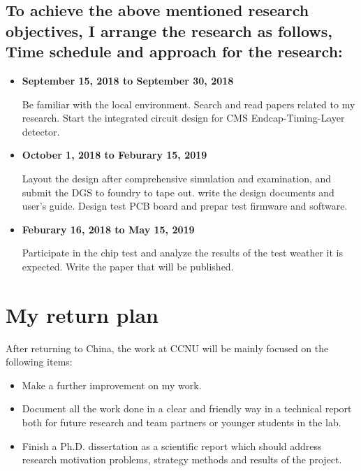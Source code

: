 \documentclass[11pt,a4paper]{article}
\begin{document}
\begin{spacing}{1.2}
\subsection*{To achieve the above mentioned research objectives, I arrange the research as follows, Time schedule and approach for the research:}
\begin{itemize}
    \item \textbf{September 15, 2018 to September 30, 2018}

Be familiar with the local environment. Search and read papers related to my research. Start the integrated circuit design for CMS Endcap-Timing-Layer detector.
    \item \textbf{October 1, 2018 to Feburary 15, 2019}
    
Layout the design after comprehensive simulation and examination, and submit the DGS to foundry to tape out. write the design documents and user's guide. Design test PCB board and prepar test firmware and software.
    \item \textbf{Feburary 16, 2018 to May 15, 2019}

Participate in the chip test and analyze the results of the test weather it is expected. Write the paper that will be published.
\end{itemize}

\section*{My return plan}     %

After returning to China, the work at CCNU will be mainly focused on the following items:
\begin{itemize}
    \item Make a further improvement on my work.
    \item Document all the work done in a clear and friendly way in a technical report both for future research and team partners or younger students in the lab.
    \item Finish a Ph.D. dissertation as a scientific report which should address research motivation problems, strategy methods and results of the project.
\end{itemize}

\end{spacing}
\end{document}
